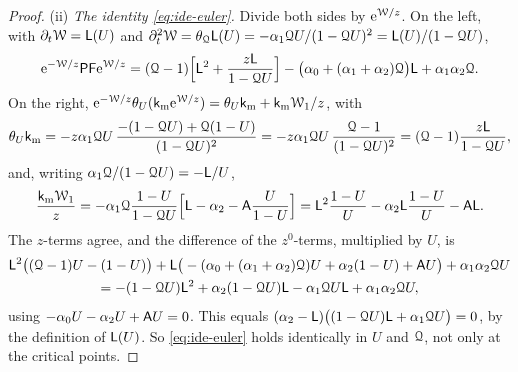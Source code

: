\begin{proof}
(ii) \emph{The identity \cref{eq:ide-euler}.} Divide both sides by $\mathrm{e}^{\mathcal{W}/z}$. On the left, with $\partial_t\mathcal{W}=\mathsf{L}(U)$ and $\partial_t^2\mathcal{W}=\theta_{\mathcal{Q}}\mathsf{L}(U)=-\alpha_1\mathcal{Q} U/(1-\mathcal{Q} U)^2=\mathsf{L}(U)/(1-\mathcal{Q} U)$,
\[
\mathrm{e}^{-\mathcal{W}/z}\mathsf{PF}\mathrm{e}^{\mathcal{W}/z}=(\mathcal{Q}-1)\Big[\mathsf{L}^2+\frac{z\mathsf{L}}{1-\mathcal{Q} U}\Big]-\big(\alpha_0+(\alpha_1+\alpha_2)\mathcal{Q}\big)\mathsf{L}+\alpha_1\alpha_2\mathcal{Q} .
\]
On the right, $\mathrm{e}^{-\mathcal{W}/z}\theta_{U}(\mathsf{k}_{\mathrm{m}}\mathrm{e}^{\mathcal{W}/z})=\theta_{U}\mathsf{k}_{\mathrm{m}}+\mathsf{k}_{\mathrm{m}}\mathcal{W}_1/z$, with
\[
\theta_{U}\mathsf{k}_{\mathrm{m}}=-z\alpha_1\mathcal{Q} U\,\frac{-(1-\mathcal{Q} U)+\mathcal{Q}(1-U)}{(1-\mathcal{Q} U)^2}=-z\alpha_1\mathcal{Q} U\,\frac{\mathcal{Q}-1}{(1-\mathcal{Q} U)^2}=(\mathcal{Q}-1)\frac{z\mathsf{L}}{1-\mathcal{Q} U},
\]
and, writing $\alpha_1\mathcal{Q}/(1-\mathcal{Q} U)=-\mathsf{L}/U$,
\[
\frac{\mathsf{k}_{\mathrm{m}}\mathcal{W}_1}{z}=-\alpha_1\mathcal{Q}\frac{1-U}{1-\mathcal{Q} U}\Big[\mathsf{L}-\alpha_2-\mathsf{A}\frac{U}{1-U}\Big]=\mathsf{L}^2\frac{1-U}{U}-\alpha_2\mathsf{L}\frac{1-U}{U}-\mathsf{A}\mathsf{L} .
\]
The $z$-terms agree, and the difference of the $z^0$-terms, multiplied by $U$, is
\begin{multline*}
\mathsf{L}^2\big((\mathcal{Q}-1)U-(1-U)\big)+\mathsf{L}\big(-(\alpha_0+(\alpha_1+\alpha_2)\mathcal{Q})U+\alpha_2(1-U)+\mathsf{A} U\big)+\alpha_1\alpha_2\mathcal{Q} U\\
=-(1-\mathcal{Q} U)\mathsf{L}^2+\alpha_2(1-\mathcal{Q} U)\mathsf{L}-\alpha_1\mathcal{Q} U\mathsf{L}+\alpha_1\alpha_2\mathcal{Q} U,
\end{multline*}
using $-\alpha_0U-\alpha_2U+\mathsf{A} U=0$. This equals $(\alpha_2-\mathsf{L})\big((1-\mathcal{Q} U)\mathsf{L}+\alpha_1\mathcal{Q} U\big)=0$, by the definition of $\mathsf{L}(U)$. So \cref{eq:ide-euler} holds identically in $U$ and $\mathcal{Q}$, not only at the critical points.


\end{proof}
